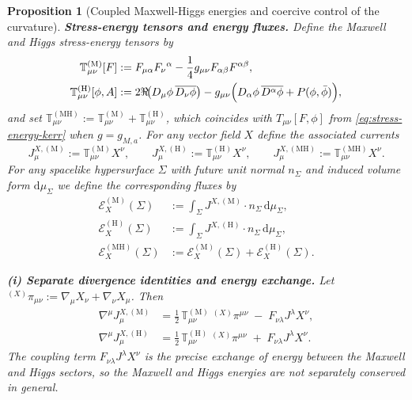 \documentclass[11pt]{article}
\numberwithin{equation}{section}
\theoremstyle{plain}
\newtheorem{proposition}[theorem]{Proposition}
\theoremstyle{definition}
\theoremstyle{remark}
\newcommand{\dd}{\mathrm{d}}
\begin{document}
\begin{proposition}[Coupled Maxwell-Higgs energies and coercive control of the curvature]
\smallskip
\noindent
\textbf{Stress-energy tensors and energy fluxes.}
Define the Maxwell and Higgs stress-energy tensors by
\begin{eqnarray}
\mathbb T^{(\mathrm M)}_{\mu\nu}[F]
&:=F_{\mu\alpha}F_{\nu}{}^{\alpha}-\frac14 g_{\mu\nu}F_{\alpha\beta}F^{\alpha\beta},
\label{eq:MH-stress-maxwell-prop42}
\\
\mathbb T^{(\mathrm H)}_{\mu\nu}[\phi,A]
&:=2\Re\!\bigl(D_{\mu}\phi\,\overline{D_{\nu}\phi}\bigr)
- g_{\mu\nu}\Bigl(D_{\alpha}\phi\,\overline{D^{\alpha}\phi}+P(\phi,\bar\phi)\Bigr),
\label{eq:MH-stress-higgs-prop42}
\end{eqnarray}
and set $\mathbb T^{(\mathrm{MH})}_{\mu\nu}:=\mathbb T^{(\mathrm M)}_{\mu\nu}+\mathbb T^{(\mathrm H)}_{\mu\nu}$, which coincides with $T_{\mu\nu}[F,\phi]$ from \eqref{eq:stress-energy-kerr} when $g=g_{M,a}$.
For any vector field $X$ define the associated currents
\begin{equation}
J^{X,(\mathrm M)}_{\mu}:=\mathbb T^{(\mathrm M)}_{\mu\nu}X^{\nu},
\qquad
J^{X,(\mathrm H)}_{\mu}:=\mathbb T^{(\mathrm H)}_{\mu\nu}X^{\nu},
\qquad
J^{X,(\mathrm{MH})}_{\mu}:=\mathbb T^{(\mathrm{MH})}_{\mu\nu}X^{\nu}.
\end{equation}
For any spacelike hypersurface $\Sigma$ with future unit normal $n_{\Sigma}$ and induced volume form $\dd\mu_{\Sigma}$ we define the corresponding fluxes by
\begin{eqnarray}\label{eq:MH-energies-prop42}
\mathcal E^{(\mathrm M)}_{X}(\Sigma)
&:=\int_{\Sigma}J^{X,(\mathrm M)}\!\cdot n_{\Sigma}\,\dd\mu_{\Sigma},\\
\mathcal E^{(\mathrm H)}_{X}(\Sigma)
&:=\int_{\Sigma}J^{X,(\mathrm H)}\!\cdot n_{\Sigma}\,\dd\mu_{\Sigma},\\
\mathcal E^{(\mathrm{MH})}_{X}(\Sigma)
&:=\mathcal E^{(\mathrm M)}_{X}(\Sigma)+\mathcal E^{(\mathrm H)}_{X}(\Sigma).
\end{eqnarray}

\smallskip
\noindent
\textbf{(i) Separate divergence identities and energy exchange.}
Let ${}^{(X)}\pi_{\mu\nu}:=\nabla_{\mu}X_{\nu}+\nabla_{\nu}X_{\mu}$.
Then
\begin{eqnarray}
\nabla^{\mu}J^{X,(\mathrm M)}_{\mu}
&=
\frac12\,\mathbb T^{(\mathrm M)}_{\mu\nu}\;{}^{(X)}\pi^{\mu\nu}
\;-\;
F_{\nu\lambda}J^{\lambda}X^{\nu},
\label{eq:MH-div-M-prop42}
\\
\nabla^{\mu}J^{X,(\mathrm H)}_{\mu}
&=
\frac12\,\mathbb T^{(\mathrm H)}_{\mu\nu}\;{}^{(X)}\pi^{\mu\nu}
\;+\;
F_{\nu\lambda}J^{\lambda}X^{\nu}.
\label{eq:MH-div-H-prop42}
\end{eqnarray}
The coupling term $F_{\nu\lambda}J^{\lambda}X^{\nu}$ is the precise exchange of energy between the Maxwell and Higgs sectors, so the Maxwell and Higgs energies are not separately conserved in general.


\end{proposition}
\end{document}
